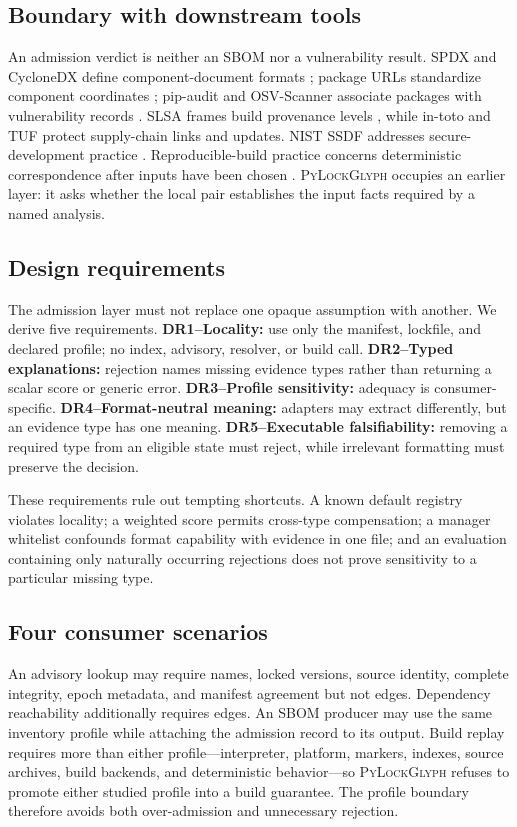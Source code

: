 \documentclass[10pt,conference]{IEEEtran}
\newcommand{\tool}{\textsc{PyLockGlyph}}
\begin{document}
\subsection{Boundary with downstream tools}
An admission verdict is neither an SBOM nor a vulnerability result. SPDX and CycloneDX define component-document formats \cite{spdxSpec,cyclonedxPythonDocs}; package URLs standardize component coordinates \cite{purlSpec}; pip-audit and OSV-Scanner associate packages with vulnerability records \cite{pipAuditDocs,osvScannerDocs}. SLSA frames build provenance levels \cite{slsaSpec}, while in-toto \cite{torresarias2019intoto} and TUF \cite{samuel2010tuf} protect supply-chain links and updates. NIST SSDF addresses secure-development practice \cite{nistSsdf}. Reproducible-build practice concerns deterministic correspondence after inputs have been chosen \cite{reproBuilds}. \tool{} occupies an earlier layer: it asks whether the local pair establishes the input facts required by a named analysis.

\subsection{Design requirements}
The admission layer must not replace one opaque assumption with another. We derive five requirements. \textbf{DR1--Locality:} use only the manifest, lockfile, and declared profile; no index, advisory, resolver, or build call. \textbf{DR2--Typed explanations:} rejection names missing evidence types rather than returning a scalar score or generic error. \textbf{DR3--Profile sensitivity:} adequacy is consumer-specific. \textbf{DR4--Format-neutral meaning:} adapters may extract differently, but an evidence type has one meaning. \textbf{DR5--Executable falsifiability:} removing a required type from an eligible state must reject, while irrelevant formatting must preserve the decision.

These requirements rule out tempting shortcuts. A known default registry violates locality; a weighted score permits cross-type compensation; a manager whitelist confounds format capability with evidence in one file; and an evaluation containing only naturally occurring rejections does not prove sensitivity to a particular missing type.

\subsection{Four consumer scenarios}
An advisory lookup may require names, locked versions, source identity, complete integrity, epoch metadata, and manifest agreement but not edges. Dependency reachability additionally requires edges. An SBOM producer may use the same inventory profile while attaching the admission record to its output. Build replay requires more than either profile---interpreter, platform, markers, indexes, source archives, build backends, and deterministic behavior---so \tool{} refuses to promote either studied profile into a build guarantee. The profile boundary therefore avoids both over-admission and unnecessary rejection.
\end{document}
